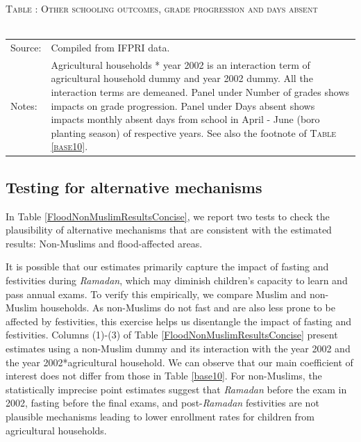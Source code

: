 \documentclass[12pt,letterpaper]{article}\usepackage[margin=1in]{geometry}
\newcommand{\0}{\ensuremath{\mbox{\boldmath $0$}}}
\begin{document}
\begin{table}\hfil\textsc{\footnotesize Table \thetable: Other schooling outcomes, grade progression and days absent\label{NumGradesDaysAbsentResults}}\\\setlength{\tabcolsep}{.5pt}\renewcommand{\arraystretch}{.675}\hspace{-2em}\hfil\\\renewcommand{\arraystretch}{1}
\hfil\begin{tabular}{>{\hfill\scriptsize}p{1cm}<{}>{\scriptsize}p{12cm}<{\hfill}} 
Source:& Compiled from IFPRI data. \\[-1ex] 
Notes:&  \textsf{Agricultural households * year 2002} is an interaction term of agricultural household dummy and year 2002 dummy. All the interaction terms are demeaned. Panel under Number of grades shows impacts on grade progression. Panel under Days absent shows impacts monthly absent days from school in April - June (boro planting season) of respective years. See also the footnote of \textsc{\footnotesize Table \ref{base10}}. 
\end{tabular} \end{table}


\subsection{Testing for alternative mechanisms}

In Table \ref{FloodNonMuslimResultsConcise}, we report two tests to check the plausibility of alternative mechanisms that are consistent with the estimated results: Non-Muslims and flood-affected areas. 

It is possible that our estimates primarily capture the impact of fasting and festivities during \textit{Ramadan}, which may diminish children's capacity to learn and pass annual exams. To verify this empirically, we compare Muslim and non-Muslim households. As non-Muslims do not fast and are also less prone to be affected by festivities, this exercise helps us disentangle the impact of fasting and festivities. Columns (1)-(3) of Table \ref{FloodNonMuslimResultsConcise} present estimates using a non-Muslim dummy and its interaction with the year 2002 and the year 2002*agricultural household. We can observe that our main coefficient of interest does not differ from those in Table \ref{base10}. For non-Muslims, the statistically imprecise point estimates suggest that \textit{Ramadan} before the exam in 2002, fasting before the final exams, and post-\textit{Ramadan} festivities are not plausible mechanisms leading to lower enrollment rates for children from agricultural households.
\end{document}
